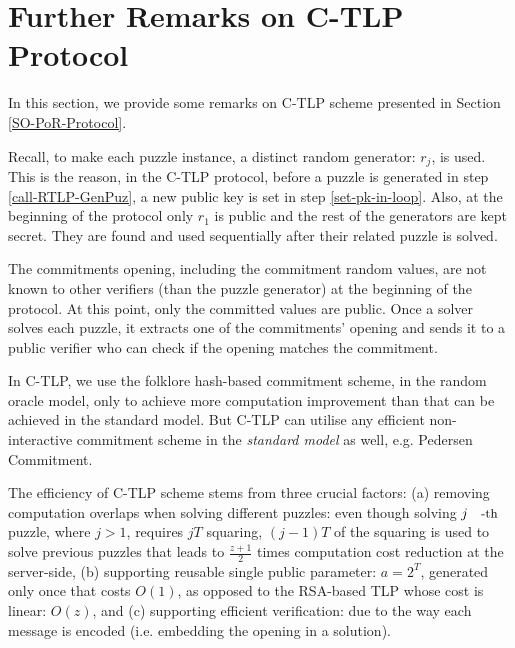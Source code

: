 

\section{Further Remarks on  C-TLP Protocol}\label{discussion-C-TLP}

In this section, we provide some remarks on  C-TLP scheme presented in Section \ref{SO-PoR-Protocol}. 

\begin{remark} Recall, to make each  puzzle instance, a distinct random generator: $r_{\scriptscriptstyle j}$, is used. This is the reason, in the C-TLP protocol, before a puzzle  is  generated   in step \ref{call-RTLP-GenPuz},  a new public key is set in step \ref{set-pk-in-loop}.  Also, at the beginning of the protocol only $r_{\scriptscriptstyle 1}$ is public and the rest of the generators are kept secret. They are found and used sequentially after their related puzzle is solved. 
\end{remark}


\begin{remark} The commitments opening, including the commitment random values, are not known to other verifiers (than the puzzle generator) at the beginning of the protocol. At this point,  only the committed values are public. Once a solver solves each puzzle,  it  extracts one of the commitments' opening and sends it to a public verifier who can check if the opening matches the commitment.  
\end{remark}

\begin{remark}
 In  C-TLP, we use the folklore hash-based commitment scheme, in the random oracle model, only to achieve more computation improvement than that can be achieved in the standard model. But C-TLP can utilise any efficient non-interactive commitment scheme in the \emph{standard model} as well, e.g. Pedersen Commitment.
\end{remark}


\begin{remark}
The efficiency of  C-TLP scheme stems from three crucial factors: (a) removing computation overlaps when solving different puzzles: even though solving $j\text{\small{-th}}$ puzzle, where $j>1$, requires $jT$ squaring, $(j-1) T$ of the squaring is used to solve previous puzzles that leads to $\frac{z+1}{2}$ times computation cost reduction at the server-side,  (b)  supporting reusable single  public parameter: $a=2^{\scriptscriptstyle T}$, generated only once that costs $O(1)$, as opposed to the RSA-based TLP whose cost is linear: $O(z)$, and (c) supporting efficient verification: due to the way each message is encoded (i.e. embedding the opening in a solution). 
\end{remark}

